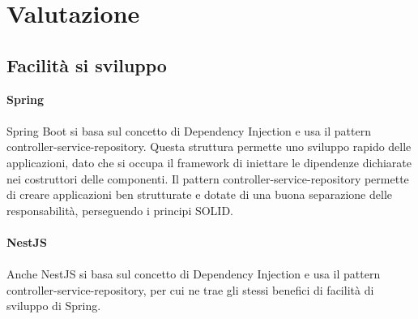 \section{Valutazione}
\subsection{Facilità si sviluppo}
\textbf{Spring}
\\\\
Spring Boot si basa sul concetto di Dependency Injection e usa il pattern controller-service-repository. 
Questa struttura permette uno sviluppo rapido delle applicazioni, dato
che si occupa il framework di iniettare le dipendenze dichiarate nei costruttori delle componenti. 
Il pattern controller-service-repository permette di creare applicazioni ben strutturate e dotate di una 
buona separazione delle responsabilità, perseguendo i principi SOLID.
\\\\
\textbf{NestJS}
\\\\
Anche NestJS si basa sul concetto di Dependency Injection e usa il pattern controller-service-repository, per
cui ne trae gli stessi benefici di facilità di sviluppo di Spring.

